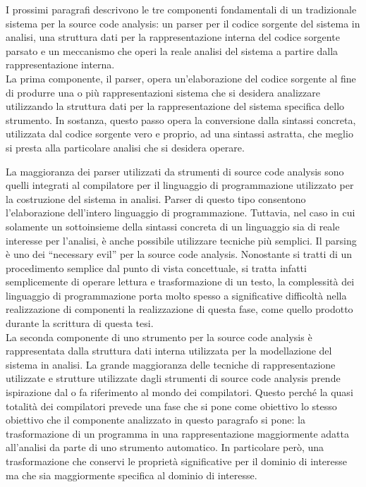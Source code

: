 I prossimi paragrafi descrivono le tre componenti fondamentali di un
tradizionale sistema per la source code analysis: un parser per il codice
sorgente del sistema in analisi, una struttura dati per la rappresentazione
interna del codice sorgente parsato e un meccanismo che operi la reale analisi
del sistema a partire dalla rappresentazione interna.\\

La prima componente, il parser, opera un'elaborazione del codice sorgente al
fine di produrre una o più rappresentazioni sistema che si desidera analizzare
utilizzando la struttura dati per la rappresentazione del sistema specifica
dello strumento. In sostanza, questo passo opera la conversione dalla sintassi
concreta, utilizzata dal codice sorgente vero e proprio, ad una sintassi
astratta, che meglio si presta alla particolare analisi che si desidera
operare.

La maggioranza dei parser utilizzati da strumenti di source code analysis sono
quelli integrati al compilatore per il linguaggio di programmazione utilizzato
per la costruzione del sistema in analisi. Parser di questo tipo consentono
l’elaborazione dell’intero linguaggio di programmazione. Tuttavia, nel caso in
cui solamente un sottoinsieme della sintassi concreta di un linguaggio sia di
reale interesse per l’analisi, è anche possibile utilizzare tecniche più
semplici. Il parsing è uno dei “necessary evil” per la source code analysis.
Nonostante si tratti di un procedimento semplice dal punto di vista
concettuale, si tratta infatti semplicemente di operare lettura e
trasformazione di un testo, la complessità dei linguaggio di programmazione
porta molto spesso a significative difficoltà nella realizzazione di componenti
la realizzazione di questa fase, come quello prodotto durante la scrittura di
questa tesi.\\

La seconda componente di uno strumento per la source code analysis è
rappresentata dalla struttura dati interna utilizzata per la modellazione del
sistema in analisi. La grande maggioranza delle tecniche di rappresentazione
utilizzate e strutture utilizzate dagli strumenti di source code analysis
prende ispirazione dal o fa riferimento al mondo dei compilatori. Questo perché
la quasi totalità dei compilatori prevede una fase che si pone come obiettivo
lo stesso obiettivo che il componente analizzato in questo paragrafo si pone:
la trasformazione di un programma in una rappresentazione maggiormente adatta
all’analisi da parte di uno strumento automatico. In particolare però, una
trasformazione che conservi le proprietà significative per il dominio di
interesse ma che sia maggiormente specifica al dominio di interesse.

